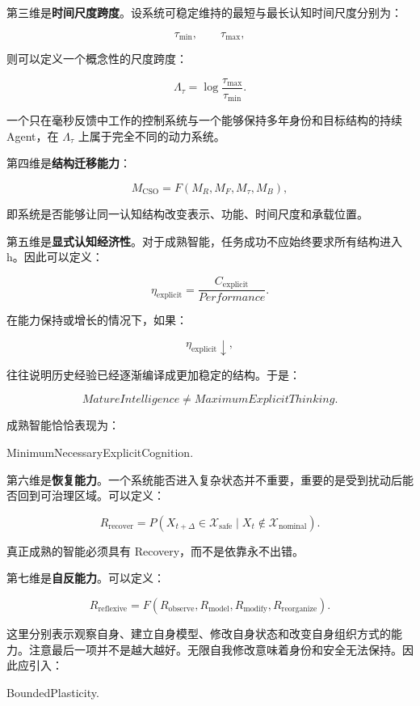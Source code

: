 第三维是\textbf{时间尺度跨度}。设系统可稳定维持的最短与最长认知时间尺度分别为：

\[
\tau_{\min},
\qquad
\tau_{\max},
\]

则可以定义一个概念性的尺度跨度：

\[
\Lambda_\tau
=
\log
\frac{\tau_{\max}}{\tau_{\min}}.
\]

一个只在毫秒反馈中工作的控制系统与一个能够保持多年身份和目标结构的持续 Agent，在 \(\Lambda_\tau\) 上属于完全不同的动力系统。

第四维是\textbf{结构迁移能力}：

\[
M_{\mathrm{CSO}}
=
F(
M_R,
M_F,
M_\tau,
M_B
),
\]

即系统是否能够让同一认知结构改变表示、功能、时间尺度和承载位置。

第五维是\textbf{显式认知经济性}。对于成熟智能，任务成功不应始终要求所有结构进入 h。因此可以定义：

\[
\eta_{\mathrm{explicit}}
=
\frac{
C_{\mathrm{explicit}}
}{
Performance
}.
\]

在能力保持或增长的情况下，如果：

\[
\eta_{\mathrm{explicit}}
\downarrow,
\]

往往说明历史经验已经逐渐编译成更加稳定的结构。于是：

\[
\boxed{
MatureIntelligence
\neq
MaximumExplicitThinking.
}
\]

成熟智能恰恰表现为：

\begin{statementbox}
MinimumNecessaryExplicitCognition.
\end{statementbox}

第六维是\textbf{恢复能力}。一个系统能否进入复杂状态并不重要，重要的是受到扰动后能否回到可治理区域。可以定义：

\[
R_{\mathrm{recover}}
=
P
\left(
X_{t+\Delta}
\in
\mathcal X_{\mathrm{safe}}
\mid
X_t
\notin
\mathcal X_{\mathrm{nominal}}
\right).
\]

真正成熟的智能必须具有 Recovery，而不是依靠永不出错。

第七维是\textbf{自反能力}。可以定义：

\[
R_{\mathrm{reflexive}}
=
F(
R_{\mathrm{observe}},
R_{\mathrm{model}},
R_{\mathrm{modify}},
R_{\mathrm{reorganize}}
).
\]

这里分别表示观察自身、建立自身模型、修改自身状态和改变自身组织方式的能力。注意最后一项并不是越大越好。无限自我修改意味着身份和安全无法保持。因此应引入：

\begin{statementbox}
BoundedPlasticity.
\end{statementbox}

